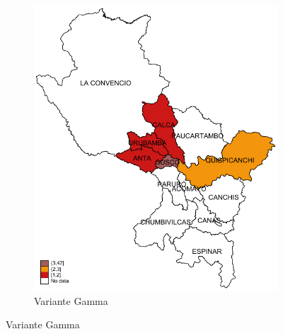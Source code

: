 \documentclass[12pt,a4paper,openany]{book}
\begin{document}
\begin{figure}[h]
\begin{subfigure}[b]{0.40\textwidth}
					\includegraphics[width=\textwidth]{../figuras/variantes_provincial_gamma.pdf}
					\caption{Variante Gamma}
				\end{subfigure}
							

\end{figure}
\end{document}
